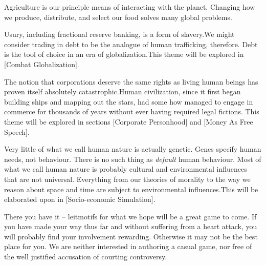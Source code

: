 
Agriculture is our principle means of interacting with the planet. Changing how we produce, distribute, and select our food solves many global problems.\footnotecite[foodwaste]


Usury, including fractional reserve banking, is a form of slavery. We might consider trading in debt to be the analogue of human trafficking, therefore. Debt is the tool of choice in an era of globalization.\footnotecite[perkins2005] This theme will be explored in [Combat Globalization].


The notion that corporations deserve the same rights as living human beings has proven itself absolutely catastrophic. Human civilization, since it first began building ships and mapping out the stars, had some how managed to engage in commerce for thousands of years without ever having required legal fictions. This theme will be explored in sections \in{}[Corporate Personhood] and \in{}[Money As Free Speech].


Very little of what we call human nature is actually genetic. Genes specify human needs, not behaviour. There is no such thing as {\it default} human behaviour. Most of what we call human nature is probably cultural and environmental influences that are not universal. Everything from our theories of morality to the way we reason about space and time are subject to environmental influences.\footnotecite[henrich2010] This will be elaborated upon in [Socio-economic Simulation].
\stopitemize

There you have it -- leitmotifs for what we hope will be a great game to come. If you have made your way thus far and without suffering from a heart attack, you will probably find your involvement rewarding. Otherwise it may not be the best place for you. We are neither interested in authoring a casual game, nor free of the well justified accusation of courting controversy.

